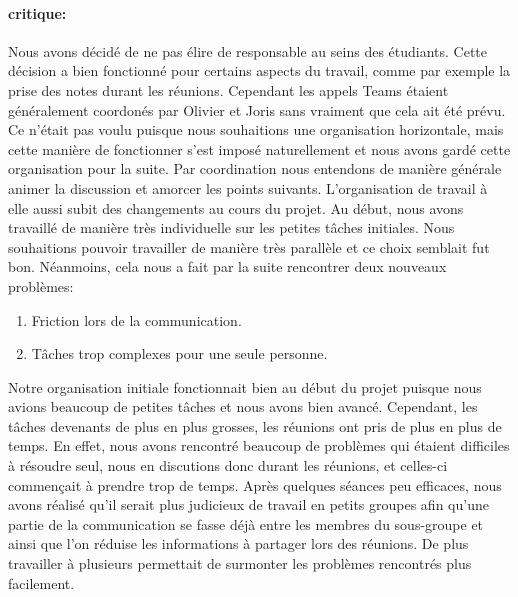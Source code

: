 \paragraph{critique:} Nous avons décidé de ne pas élire de responsable au seins des étudiants. Cette décision a bien fonctionné pour certains aspects du travail, comme par exemple la prise des notes durant les réunions.
Cependant les appels Teams étaient généralement coordonés par Olivier et Joris sans vraiment que cela ait été prévu. Ce n'était pas voulu puisque nous souhaitions une organisation horizontale, mais cette manière de fonctionner s'est imposé naturellement et nous avons gardé cette organisation pour la suite. Par coordination nous entendons de manière générale animer la discussion et amorcer les points suivants. 
L'organisation de travail à elle aussi subit des changements au cours du projet. Au début, nous avons travaillé de manière très individuelle sur les petites tâches initiales. Nous souhaitions pouvoir travailler de manière très parallèle et ce choix semblait fut bon.
Néanmoins, cela nous a fait par la suite rencontrer deux nouveaux problèmes:
\begin{enumerate}
    \item Friction lors de la communication. \label{item:friction}
    \item Tâches trop complexes pour une seule personne. \label{item:complex}
\end{enumerate}
Notre organisation initiale fonctionnait bien au début du projet puisque nous avions beaucoup de petites tâches et nous avons bien avancé. 
Cependant, les tâches devenants de plus en plus grosses, les réunions ont pris de plus en plus de temps. 
En effet, nous avons rencontré beaucoup de problèmes qui étaient difficiles à résoudre seul, nous en discutions donc durant les réunions, et celles-ci commençait à prendre trop de temps.
Après quelques séances peu efficaces, nous avons réalisé qu'il serait plus judicieux de travail en petits groupes afin qu'une partie de la communication se fasse déjà entre les membres du sous-groupe et ainsi que l'on réduise les informations à partager lors des réunions. De plus travailler à plusieurs permettait de surmonter les problèmes rencontrés plus facilement.
